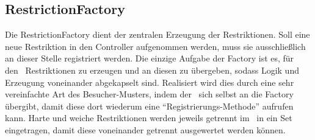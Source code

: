 \subsection{RestrictionFactory}\label{subsec:RestrictionFactory}
Die RestrictionFactory dient der zentralen Erzeugung der Restriktionen.
Soll eine neue Restriktion in den Controller aufgenommen werden, muss sie ausschließlich an dieser Stelle
registriert werden.
Die einzige Aufgabe der Factory ist es, für den~ Restriktionen
zu erzeugen und an diesen zu übergeben, sodass Logik und Erzeugung voneinander abgekapselt sind.
Realisiert wird dies durch eine sehr vereinfachte Art des Besucher-Musters, indem der~
sich selbst an die Factory übergibt, damit diese dort wiederum eine \enquote{Registrierungs-Methode} aufrufen kann.
Harte und weiche Restriktionen werden jeweils getrennt im~ in ein
Set eingetragen, damit diese voneinander getrennt ausgewertet werden können.